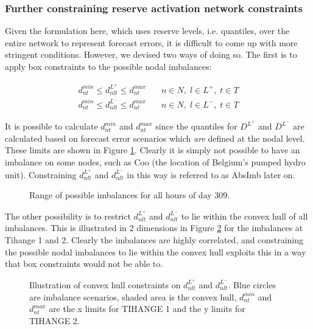 \documentclass[number,times]{elsarticle}
\begin{document}
\subsubsection{Further constraining reserve activation network constraints} \label{sec:further_constraining_operating_reserve_network_activation_constraints}

Given the formulation here, which uses reserve levels, i.e. quantiles, over the entire network to represent forecast errors, it is difficult to come up with more stringent conditions. However, we devised two ways of doing so. The first is to apply box constraints to the possible nodal imbalances:

\begin{align}
    d_{nt}^{min} \leq d_{nlt}^{L^+} \leq d_{nt}^{max} & \quad n \in N, \; l \in L^+, \; t \in T \\
    d_{nt}^{min} \leq d_{nlt}^{L^-} \leq d_{nt}^{max} & \quad n \in N, \; l \in L^-, \; t \in T
\end{align}

It is possible to calculate $d_{nt}^{min}$ and $d_{nt}^{max}$ since the quantiles for $D^{L^+}$ and $D^{L^-}$ are calculated based on forecast error scenarios which \emph{are} defined at the nodal level. These limits are shown in Figure \ref{fig:imbalance_range}. Clearly it is simply not possible to have an imbalance on some nodes, such as Coo (the location of Belgium's pumped hydro unit). Constraining $d_{nlt}^{L^+}$ and $d_{nlt}^{L^-}$ in this way is referred to as AbsImb later on.

\begin{figure}[ht]
    \centering
    \caption{Range of possible imbalances for all hours of day 309.\label{fig:imbalance_range}}
\end{figure}

The other possibility is to restrict $d_{nlt}^{L^+}$ and $d_{nlt}^{L^-}$ to lie within the convex hull of all imbalances. This is illustrated in 2 dimensions in Figure \ref{fig:convex_hull_tihange} for the imbalances at Tihange 1 and 2. Clearly the imbalances are highly correlated, and constraining the possible nodal imbalances to lie within the convex hull exploits this in a way that box constraints would not be able to.

\begin{figure}[ht]
    \centering
    \caption{Illustration of convex hull constraints on $d_{nlt}^{L^+}$ and $d_{nlt}^{L^-}$. Blue circles are imbalance scenarios, shaded area is the convex hull, $d_{nt}^{min}$ and $d_{nt}^{max}$ are the x limits for TIHANGE 1 and the y limits for TIHANGE 2. \label{fig:convex_hull_tihange}}
\end{figure}
\end{document}
